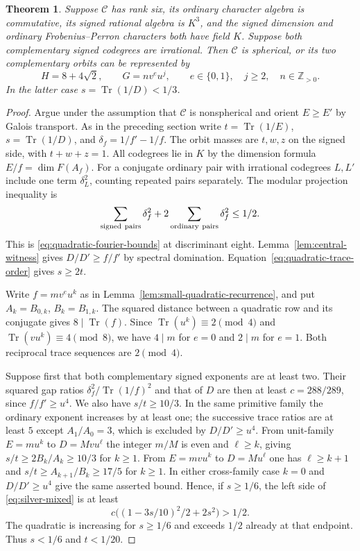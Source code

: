 \documentclass[11pt,reqno]{amsart}
\newtheorem{theorem}{Theorem}[section]
\theoremstyle{remark}\newtheorem{remark}[theorem]{Remark}
\numberwithin{equation}{section}
\begin{document}
\begin{theorem}\label{thm:silver-finite-orbit}
Suppose $\mathcal C$ has rank six, its ordinary character algebra
is commutative, its signed rational algebra is $K^3$, and the
signed dimension and ordinary Frobenius--Perron characters both have field
$K$. Suppose both complementary signed codegrees are irrational.
Then $\mathcal C$ is spherical, or its two complementary orbits
can be represented by
\[
 H=8+4\sqrt2,\qquad G=nv^e u^j,\qquad
 e\in\{0,1\},\quad j\ge2,\quad n\in\mathbb Z_{>0}.
\]
In the latter case $s=\operatorname{Tr}(1/D)<1/3$.
\end{theorem}
\begin{proof}
Argue under the assumption that $\mathcal C$ is nonspherical and
orient $E\ge E'$ by Galois transport. As in the preceding section
write $t=\operatorname{Tr}(1/E)$, $s=\operatorname{Tr}(1/D)$, and
$\delta_f=1/f'-1/f$. The orbit masses are $t,w,z$ on the signed
side, with $t+w+z=1$. All codegrees lie in $K$ by the dimension
formula $E/f=\dim F(A_f)$. For a conjugate ordinary pair with
irrational codegrees $L,L'$ include one term $\delta_L^2$, counting
repeated pairs separately. The modular projection inequality is
\begin{equation}\label{eq:silver-mixed}
 \sum_{\rm signed\ pairs}\delta_f^2+
   2\sum_{\rm ordinary\ pairs}\delta_f^2\le1/2.
\end{equation}
This is \eqref{eq:quadratic-fourier-bounds} at discriminant eight. Lemma~\ref{lem:central-witness} gives $D/D'\ge f/f'$ by
spectral domination. Equation~\eqref{eq:quadratic-trace-order} gives $s\ge2t$.

Write $f=mv^eu^k$ as in Lemma~\ref{lem:small-quadratic-recurrence},
and put $A_k=B_{0,k}$, $B_k=B_{1,k}$. The squared distance between
a quadratic row and its conjugate gives $8\mid\operatorname{Tr}(f)$.
Since $\operatorname{Tr}(u^k)\equiv2\pmod4$ and
$\operatorname{Tr}(vu^k)\equiv4\pmod8$, we have $4\mid m$ for
$e=0$ and $2\mid m$ for $e=1$. Both reciprocal trace sequences
are $2\pmod4$.

Suppose first that both complementary signed exponents are at least
two. Their squared gap ratios $\delta_f^2/\operatorname{Tr}(1/f)^2$
and that of $D$ are then at least $c=288/289$, since $f/f'\ge u^4$.
We also have $s/t\ge10/3$. In the same primitive family the
ordinary exponent increases by at least one; the successive trace
ratios are at least $5$ except $A_1/A_0=3$, which is excluded by
$D/D'\ge u^4$. From unit-family $E=mu^k$ to $D=Mvu^\ell$
the integer $m/M$ is even and $\ell\ge k$, giving
$s/t\ge2B_k/A_k\ge10/3$ for $k\ge1$. From $E=mvu^k$ to
$D=Mu^\ell$ one has $\ell\ge k+1$ and
$s/t\ge A_{k+1}/B_k\ge17/5$ for $k\ge1$.
In either cross-family case $k=0$ and
$D/D'\ge u^4$ give the same asserted bound. Hence, if $s\ge1/6$,
the left side of \eqref{eq:silver-mixed} is at least
\[
 c\bigl((1-3s/10)^2/2+2s^2\bigr)>1/2.
\]
The quadratic is increasing for $s\ge1/6$ and exceeds $1/2$
already at that endpoint. Thus $s<1/6$ and $t<1/20$.


\end{proof}
\end{document}
